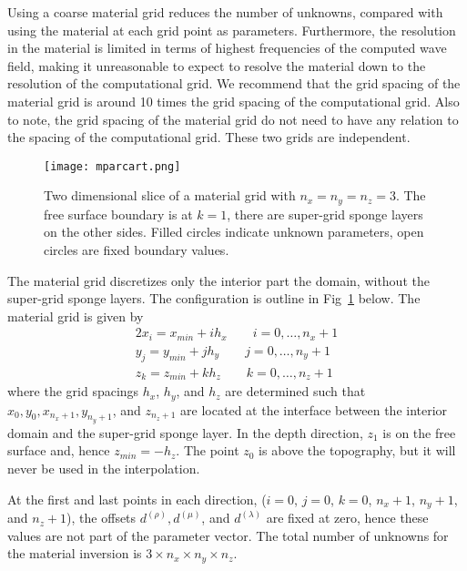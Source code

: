 \documentclass[12pt]{report}
\begin{document}
\par
Using a coarse material grid reduces the number of unknowns, compared with using the 
material at each grid point as parameters. Furthermore, the resolution in the material
is limited in terms of highest frequencies of the computed wave field, making it unreasonable
to expect to resolve the material down to the resolution of the computational grid.
We recommend that the grid spacing of the material grid is around 10 times 
the grid spacing of the computational grid. Also to note, the grid spacing of the material 
grid do not need to have any relation to the spacing of the computational grid. 
These two grids are independent.
\par
\begin{figure}
\begin{center}
\texttt{[image: mparcart.png]}
\caption{Two dimensional slice of a material grid with $n_x=n_y=n_z=3$. The free surface boundary
is at $k=1$, there are super-grid sponge layers on the other sides. Filled circles indicate unknown
parameters, open circles are fixed boundary values.}
\label{fig:mparcart}
\end{center}
\end{figure}
\par
The material grid discretizes only the interior part the domain, without the super-grid
sponge layers. The configuration is outline in Fig~\ref{fig:mparcart} below.
The material grid is given by
\begin{alignat}{2}
 x_i = x_{min}+ i h_x \qquad i=0,\ldots,n_x+1\\
 y_j = y_{min}+ j h_y \qquad j=0,\ldots,n_y+1\\
 z_k = z_{min}+ k h_z \qquad k=0,\ldots,n_z+1
\end{alignat}
where the grid spacings $h_x$, $h_y$, and $h_z$ are determined such that $x_0, y_0, x_{n_x+1}, y_{n_y+1}$,
and $z_{n_z+1}$ are located at the interface between the interior domain and the super-grid sponge layer. 
In the depth direction, $z_1$ is on the free surface and, hence $z_{min}=-h_z$. The point $z_0$ is above the 
topography, but it will never be used in the interpolation. 

At the first and last points in each direction, ($i=0$, $j=0$, $k=0$, $n_x+1$, $n_y+1$, and $n_z+1$),
the offsets $d^{(\rho)}, d^{(\mu)}$, and $d^{(\lambda)}$ are fixed at zero, hence these values are
not part of the parameter vector. The total number of unknowns for the material inversion
is $3 \times n_x \times n_y \times n_z$.
\end{document}
